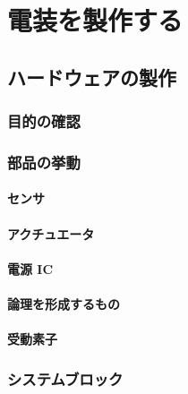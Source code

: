 \documentclass[dvipdfmx]{jsbook}
\begin{document}
\clearpage

\part{電装を製作する}

\chapter{ハードウェアの製作}

\section{目的の確認}


\section{部品の挙動}

\subsection{センサ}

\subsection{アクチュエータ}

\subsection{電源 IC}

\subsection{論理を形成するもの}
\label{subsec:論理を形成するもの}

\subsection{受動素子}


\section{システムブロック}
\end{document}
